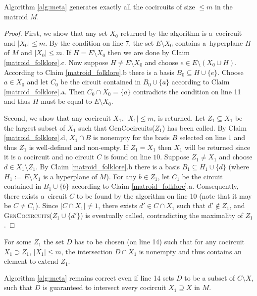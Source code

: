 \begin{thm}
	\label{meta_alg_correctness}
	Algorithm \ref{alg:meta} generates exactly all the cocircuits of size $\leq m$ in the matroid $M$.
\end{thm}

\begin{proof}
	First, we show that any set $X_0$ returned by the algorithm is a~cocircuit and $\lvert X_0 \rvert \leq m$. By the condition on line 7, the set $E \setminus X_0$ contains a~hyperplane $H$ of $M$ and $\lvert X_0 \rvert \leq m$. If $H = E \setminus X_0$ then we are done by Claim \ref{matroid_folklore}.c. Now suppose $H \neq E \setminus X_0$ and choose $e \in E \setminus (X_0 \cup H)$. According to Claim \ref{matroid_folklore}.b there is a basis $B_0 \subseteq H \cup \{e\}$. Choose $a \in X_0$ and let $C_0$ be the circuit contained in $B_0 \cup \{a\}$ according to Claim \ref{matroid_folklore}.a. Then $C_0 \cap X_0 = \{a\}$ contradicts the condition on line 11 and thus $H$ must be equal to $E \setminus X_0$.

	Second, we show that any cocircuit $X_1$, $\lvert X_1 \rvert \leq m$, is returned. Let ${Z_1 \subseteq X_1}$ be the largest subset of $X_1$ such that GenCocircuits($Z_1$) has been called. By Claim \ref{matroid_folklore}.d, $X_1 \cap B$ is nonempty for the basis $B$ selected on line $1$ and thus $Z_1$ is well-defined and non-empty.
	If ${Z_1 = X_1}$ then $X_1$ will be returned since it is a cocircuit and no circuit $C$ is found on line $10$. Suppose $Z_1 \neq X_1$ and choose $d \in X_1 \setminus Z_1$. By Claim \ref{matroid_folklore}.b there is a basis $B_1 \subseteq H_1 \cup \{d\}$ (where $H_1 := E \setminus X_1$ is a hyperplane of $M$). For any $b \in Z_1$, let $C_1$ be the circuit contained in $B_1 \cup \{b\}$ according to Claim \ref{matroid_folklore}.a. Consequently, there exists a~circuit $C$ to be found by the algorithm on line 10 (note that it may be $C \neq C_1$). Since $\lvert C \cap X_1 \rvert \neq 1$, there exists $d' \in C \cap X_1$ such that $d'\not\in Z_1$, and \textsc{GenCocircuits}($Z_1 \cup \{d'\}$) is eventually called, contradicting the maximality of $Z_1$.
\end{proof}

For some $Z_1$ the set $D$ has to be chosen (on line 14) such that for any cocircuit $X_1 \supset Z_1$, $\lvert X_1 \rvert \leq m$, the intersection $D \cap X_1$ is nonempty and thus contains an element to extend $Z_1$.

\begin{cor}
	\label{cor_circuit_subset}
	Algorithm \ref{alg:meta} remains correct even if line 14 sets $D$ to be a subset of $C \setminus X$, such that $D$ is guaranteed to intersect every cocircuit $X_1 \supseteq X$ in $M$.
\end{cor}

